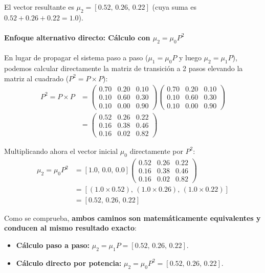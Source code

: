 El vector resultante es $\mu_2 = [0.52, \, 0.26, \, 0.22]$ (cuya suma es $0.52 + 0.26 + 0.22 = 1.0$).

\paragraph{Enfoque alternativo directo: Cálculo con $\mu_2 = \mu_0 P^2$}
En lugar de propagar el sistema paso a paso ($\mu_1 = \mu_0 P$ y luego $\mu_2 = \mu_1 P$), podemos calcular directamente la matriz de transición a 2 pasos elevando la matriz al cuadrado ($P^2 = P \times P$):
\begin{align*}
  P^2 = P \times P &= \begin{pmatrix}
    0.70 & 0.20 & 0.10 \\
    0.10 & 0.60 & 0.30 \\
    0.10 & 0.00 & 0.90
  \end{pmatrix}
  \begin{pmatrix}
    0.70 & 0.20 & 0.10 \\
    0.10 & 0.60 & 0.30 \\
    0.10 & 0.00 & 0.90
  \end{pmatrix} \\
  &= \begin{pmatrix}
    0.52 & 0.26 & 0.22 \\
    0.16 & 0.38 & 0.46 \\
    0.16 & 0.02 & 0.82
  \end{pmatrix}
\end{align*}

Multiplicando ahora el vector inicial $\mu_0$ directamente por $P^2$:
\begin{align*}
  \mu_2 = \mu_0 P^2 &= [1.0, \, 0.0, \, 0.0] \begin{pmatrix}
    0.52 & 0.26 & 0.22 \\
    0.16 & 0.38 & 0.46 \\
    0.16 & 0.02 & 0.82
  \end{pmatrix} \\
  &= [ (1.0 \times 0.52), \, (1.0 \times 0.26), \, (1.0 \times 0.22) ] \\
  &= \mathbf{[0.52, \, 0.26, \, 0.22]}
\end{align*}

Como se comprueba, \textbf{ambos caminos son matemáticamente equivalentes y conducen al mismo resultado exacto}:
\begin{itemize}
  \item \textbf{Cálculo paso a paso:} $\mu_2 = \mu_1 P = [0.52, \, 0.26, \, 0.22]$.
  \item \textbf{Cálculo directo por potencia:} $\mu_2 = \mu_0 P^2 = [0.52, \, 0.26, \, 0.22]$.
\end{itemize}

